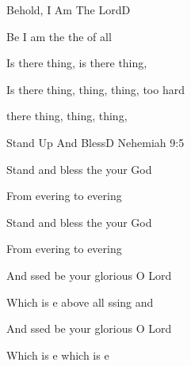 \begin{song}{Behold, I Am The Lord}{D}
  {}
  {}
  {}
  {\NotCCLIed}

  \renewcommand{\RevDate}{February~11,~1993}

  \begin{SBOpGroup}
    Be I am the  the  of all 
    
    Is there thing, is there thing,    
    
    Is there thing, thing, thing, too hard  
    
     there thing, thing, thing,    
  \end{SBOpGroup}
\end{song}


\begin{song}{Stand Up And Bless}{D}
  {}
  {}
  {Nehemiah 9:5}
  {\NotCCLIed}

  \renewcommand{\RevDate}{February~11,~1993}

  \begin{SBOpGroup}
    Stand  and bless the  your God
    
    From evering to evering
    
    Stand  and bless the  your God
    
    From evering to evering
  \end{SBOpGroup}

\WBPageBrk
  \begin{SBChorus}
    And ssed be your glorious  O Lord

    Which is e above all ssing and 

    And ssed be your glorious  O Lord

    Which is e which is e
  \end{SBChorus}
\end{song}


